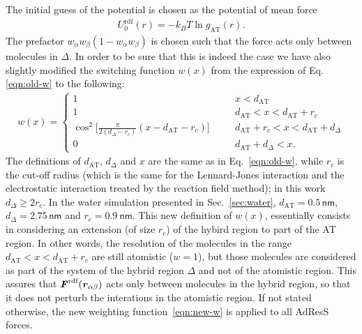 \documentclass[aps,prb,preprint,citeautoscript]{revtex4}
\newcommand{\recheck}[1]{{\color{red} #1}}
\newcommand{\redc}[1]{{\color{red} #1}}
\renewcommand{\v}[1]{\textbf{\textit{#1}}}
\begin{document}
The initial guess of the potential is chosen as the
potential of mean force
\begin{align}\label{eqn:pmf}
  U^{\textrm{rdf}}_0(r) = -k_BT \ln g_{\textrm{AT}}(r).
\end{align} 
The prefactor $ w_\alpha w_\beta (1-w_\alpha w_\beta)$ is chosen such that the force acts only between molecules in $\Delta$. In order to be sure that this is indeed the case we have also slightly modified the switching function $w(x)$ from the expression of Eq.\ref{eqn:old-w} to the following:
\begin{align}\label{eqn:new-w}
  w(x) =
  \left\{
    \begin{array}{lcl}
      1 &\quad& x < d_{\textrm{AT}}\\
      1  && d_{\textrm{AT}} < x < d_{\textrm{AT}} + r_c\\
      \cos^2\big[\frac{\pi}{2(d_{{\Delta}} - r_c)} (x - d_{\textrm{AT}} - r_c)\big] && d_{\textrm{AT}} + r_c < x < d_{\textrm{AT}} + d_{{\Delta}} \\
      0 && d_{\textrm{AT}} + d_{{\Delta}}  < x.
    \end{array}
  \right.
\end{align}
The definitions of $d_{\textrm{AT}}$, $d_{{\Delta}}$ and $x$ are the
same as in Eq.~\eqref{eqn:old-w}, while $r_c$ is the cut-off radius
(which is the same for the Lennard-Jones interaction and the
electrostatic interaction treated by the reaction field method); in
this work $d_{{\Delta}} \geq 2r_c$. \redc{In the water simulation
  presented in Sec.~\ref{sec:water}, $d_{\textrm{AT}} = 0.5\,
  \textsf{nm}$, $d_{\Delta} = 2.75\, \textsf{nm}$ and $r_c = 0.9\
  \textsf{nm}$.}
This new definition of $w(x)$, essentially consists
in considering an extension (of size $r_c$) of the hybird region to
part of the AT region.
\redc{
In other words, the resolution of the molecules in the range
$d_{\textrm{AT}} < x < d_{\textrm{AT}} + r_c$ are still atomistic
($w=1$), but those molecules are considered as part of the system of
the hybrid region $\Delta$ and not of the atomistic region.
This assures that $\v
F^{\textrm{rdf}}(\v r_{\alpha\beta})$ acts only between molecules
in the hybrid region, so that it does not perturb the interations
in the atomistic region.}
\recheck{If not stated
  otherwise, the new weighting function~\eqref{eqn:new-w} is applied
  to all AdResS forces.}
\end{document}
